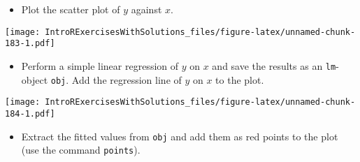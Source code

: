 \documentclass[]{article}
\newenvironment{Shaded}{\begin{snugshade}}{\end{snugshade}}
\newcommand{\KeywordTok}[1]{\textcolor[rgb]{0.13,0.29,0.53}{\textbf{#1}}}
\newcommand{\DataTypeTok}[1]{\textcolor[rgb]{0.13,0.29,0.53}{#1}}
\newcommand{\StringTok}[1]{\textcolor[rgb]{0.31,0.60,0.02}{#1}}
\newcommand{\OperatorTok}[1]{\textcolor[rgb]{0.81,0.36,0.00}{\textbf{#1}}}
\newcommand{\NormalTok}[1]{#1}
\providecommand{\tightlist}{%
  \setlength{\itemsep}{0pt}\setlength{\parskip}{0pt}}
\begin{document}
\begin{itemize}
\tightlist
\item
  Plot the scatter plot of \(y\) against \(x\).
\end{itemize}

\begin{Shaded}
\end{Shaded}

\texttt{[image: IntroRExercisesWithSolutions\_files/figure-latex/unnamed-chunk-183-1.pdf]}

\begin{itemize}
\tightlist
\item
  Perform a simple linear regression of \(y\) on \(x\) and save the
  results as an \texttt{lm}-object \texttt{obj}. Add the regression line
  of \(y\) on \(x\) to the plot.
\end{itemize}

\begin{Shaded}
\end{Shaded}

\texttt{[image: IntroRExercisesWithSolutions\_files/figure-latex/unnamed-chunk-184-1.pdf]}

\begin{itemize}
\tightlist
\item
  Extract the fitted values from \texttt{obj} and add them as red points
  to the plot (use the command \texttt{points}).
\end{itemize}

\begin{Shaded}
\end{Shaded}
\end{document}

